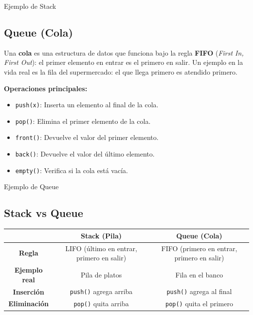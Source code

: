 \documentclass{article}
\newcommand{\cppfile}[2][]{
    \begin{container}{\faCode \space \space  #1}
        
    \end{container}
}
\begin{document}
\cppfile[Ejemplo de Stack]{codes/stack.cpp}

\vspace{0.5cm}

\subsection{Queue (Cola)}

Una \textbf{cola} es una estructura de datos que funciona bajo la regla \textbf{FIFO} (\textit{First In, First Out}): el primer elemento en entrar es el primero en salir.  
Un ejemplo en la vida real es la fila del supermercado: el que llega primero es atendido primero.

\textbf{Operaciones principales:}
\begin{itemize}
    \item \texttt{push(x)}: Inserta un elemento al final de la cola.
    \item \texttt{pop()}: Elimina el primer elemento de la cola.
    \item \texttt{front()}: Devuelve el valor del primer elemento.
    \item \texttt{back()}: Devuelve el valor del último elemento.
    \item \texttt{empty()}: Verifica si la cola está vacía.
\end{itemize}

\cppfile[Ejemplo de Queue]{codes/queue.cpp}

\vspace{0.5cm}

\subsection{Stack vs Queue}

\begin{center}
\begin{tabular}{|c|c|c|}
\hline
 & \textbf{Stack (Pila)} & \textbf{Queue (Cola)} \\
\hline
\textbf{Regla} & LIFO (último en entrar, primero en salir) & FIFO (primero en entrar, primero en salir) \\
\hline
\textbf{Ejemplo real} & Pila de platos & Fila en el banco \\
\hline
\textbf{Inserción} & \texttt{push()} agrega arriba & \texttt{push()} agrega al final \\
\hline
\textbf{Eliminación} & \texttt{pop()} quita arriba & \texttt{pop()} quita el primero \\
\hline
\end{tabular}
\end{center}
\end{document}

